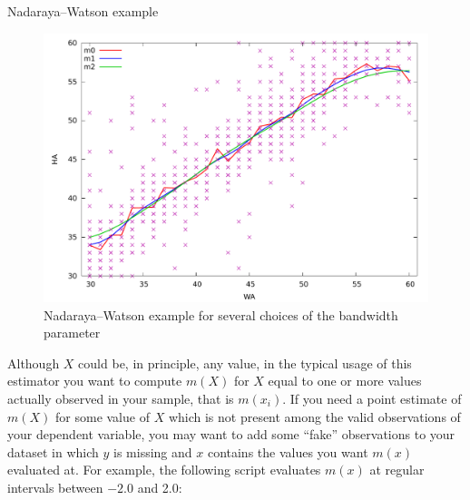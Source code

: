 \begin{script}[htbp]
  \caption{Nadaraya--Watson example}
  \label{scr:nadarwat-ex}
\end{script}

\begin{figure}[htbp]
  \centering
  \includegraphics[scale=0.5]{figures/nadarwat-ex}
  \caption{Nadaraya--Watson example for several choices of the bandwidth parameter}
  \label{fig:nadarwat-ex}
\end{figure}

Although $X$ could be, in principle, any value, in the typical usage
of this estimator you want to compute $m(X)$ for $X$ equal to one or
more values actually observed in your sample, that is $m(x_i)$. If you
need a point estimate of $m(X)$ for some value of $X$ which is not
present among the valid observations of your dependent variable, you
may want to add some ``fake'' observations to your dataset in which
$y$ is missing and $x$ contains the values you want $m(x)$ evaluated
at. For example, the following script evaluates $m(x)$ at regular
intervals between $-2.0$ and 2.0:

